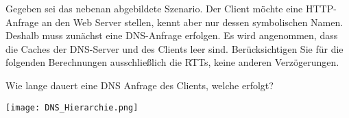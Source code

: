 
\question[5]
\begin{minipage}[]{.45\linewidth}
Gegeben sei das nebenan abgebildete Szenario. Der Client möchte eine HTTP-Anfrage
an den Web Server stellen, kennt aber nur dessen symbolischen Namen. Deshalb
muss zunächst eine DNS-Anfrage erfolgen. Es wird angenommen, dass die Caches
der DNS-Server und des Clients leer sind.  Berücksichtigen Sie für die folgenden
Berechnungen ausschließlich die RTTs, keine anderen Verzögerungen.

Wie lange dauert eine DNS Anfrage des Clients, welche \rekit{} erfolgt?
\end{minipage}
\hfill
\begin{minipage}[]{.45\linewidth}
	\texttt{[image: DNS\_Hierarchie.png]}
\end{minipage}


\begin{solutionbox}{1.5cm}
	\sol
\end{solutionbox}
